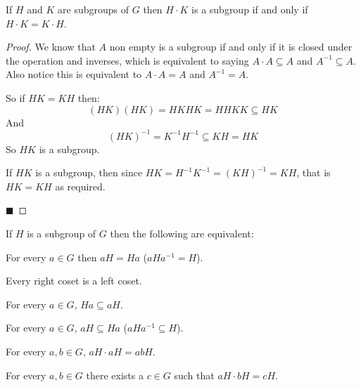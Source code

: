 \begin{prop*}

    If $H$ and $K$ are subgroups of $G$ then $H\cdot K$ is a subgroup if and only if $H\cdot K=K\cdot H$.

\end{prop*}

\begin{proof}

    We know that $A$ non empty is a subgroup if and only if it is closed under the operation and inverses, which is equivalent to saying $A\cdot A\subseteq A$ and $A^{-1}\subseteq A$.
    Also notice this is equivalent to $A\cdot A=A$ and $A^{-1}=A$.

    So if $HK=KH$ then:
    \[ (HK)(HK) = HKHK = HHKK \subseteq HK \]
    And
    \[ (HK)^{-1} = K^{-1}H^{-1} \subseteq KH = HK \]
    So $HK$ is a subgroup.

    If $HK$ is a subgroup, then since $HK=H^{-1}K^{-1}=(KH)^{-1}=KH$, that is $HK=KH$ as required.

    \hfill$\blacksquare$

\end{proof}

\begin{prop*}

    If $H$ is a subgroup of $G$ then the following are equivalent:
    \blist
        \item For every $a\in G$ then $aH=Ha$ ($aHa^{-1}=H$).
        \item Every right coset is a left coset.
        \item For every $a\in G$, $Ha\subseteq aH$.
        \item For every $a\in G$, $aH\subseteq Ha$ ($aHa^{-1}\subseteq H$).
        \item For every $a,b\in G$, $aH\cdot aH=abH$.
        \item For every $a,b\in G$ there exists a $c\in G$ such that $aH\cdot bH=cH$.
    \elist

\end{prop*}

